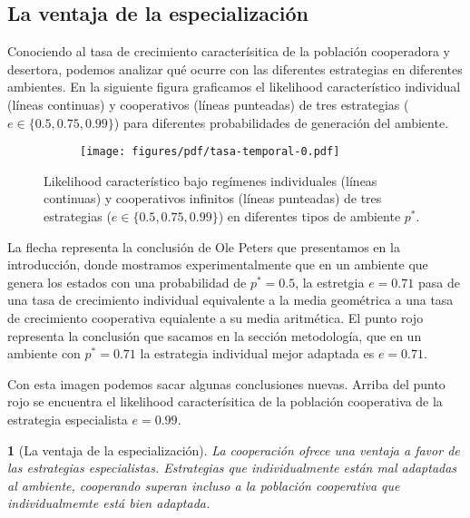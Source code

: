 \documentclass[a4paper,10pt]{article}
\newif\ifen
\newif\ifes
\newcommand{\en}[1]{\ifen#1\fi}
\newcommand{\es}[1]{\ifes#1\fi}
\newtheorem{conclution}{\en{Conclution}\es{Conclusión}}%
\begin{document}
\subsection{La ventaja de la especialización}

Conociendo al tasa de crecimiento caracterísitica de la población cooperadora y desertora, podemos analizar qué ocurre con las diferentes estrategias en diferentes ambientes.
En la siguiente figura graficamos el likelihood característico individual (líneas continuas) y cooperativos (líneas punteadas) de tres estrategias ($e \in \{0.5, 0.75, 0.99\}$) para diferentes probabilidades de generación del ambiente.
%
\begin{figure}[H]
    \centering
    \begin{subfigure}[b]{0.66\textwidth}
    \texttt{[image: figures/pdf/tasa-temporal-0.pdf]}
    \end{subfigure}
    \caption{Likelihood característico bajo regímenes individuales (líneas continuas) y cooperativos infinitos (líneas punteadas) de tres estrategias ($e \in \{0.5, 0.75, 0.99\}$) en diferentes tipos de ambiente $p^*$.}
    \label{fig:fitness_temporal}
\end{figure}
%
La flecha representa la conclusión de Ole Peters que presentamos en la introducción, donde mostramos experimentalmente que en un ambiente que genera los estados con una probabilidad de $p^* = 0.5$, la estretgia $e=0.71$ pasa de una tasa de crecimiento individual equivalente a la media geométrica a una tasa de crecimiento cooperativa equialente a su media aritmética.
El punto rojo representa la conclusión que sacamos en la sección metodología, que en un ambiente con $p^*=0.71$ la estrategia individual mejor adaptada es $e=0.71$.


Con esta imagen podemos sacar algunas conclusiones nuevas.
Arriba del punto rojo se encuentra el likelihood caracterísitica de la población cooperativa de la estrategia especialista $e=0.99$.

\begin{conclution}[La ventaja de la especialización]
La cooperación ofrece una ventaja a favor de las estrategias especialistas. Estrategias que individualmente están mal adaptadas al ambiente, cooperando superan incluso a la población cooperativa que individualmemte está bien adaptada.
\end{conclution}
\end{document}

